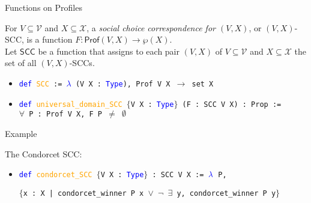 \documentclass[12pt,xcolor=svgnames,blue,aspectratio=169]{beamer}
\begin{document}
\begin{frame}

{\Huge Functions on Profiles}

\end{frame}
\begin{frame}

\begin{definition} For $V\subseteq\mathcal{V}$ and $X\subseteq\mathcal{X}$, a \textit{social choice correspondence for $(V,X)$}, or $(V,X)$-SCC, is a function  $F: \mathsf{Prof}(V,X)\to \wp(X)$. \\[8pt]


Let $\mathsf{SCC}$ be a function that assigns to each pair $(V,X)$ of $V\subseteq\mathcal{V}$ and $X\subseteq\mathcal{X}$ the set of all $(V,X)$-SCCs.
\end{definition}

\pause 
\begin{itemize}
\item[] \texttt{\textcolor{blue}{def} \textcolor{orange}{SCC} := \textcolor{blue}{$\lambda$} (V X : \textcolor{blue}{Type}), Prof V X $\to$ set X}
\end{itemize}

 
\vspace{.25in}
\pause

\begin{itemize}
\item[] \texttt{\textcolor{blue}{def} \textcolor{orange}{universal\_domain\_SCC} $\{$V X : \textcolor{blue}{Type}$\}$ (F : SCC V X) : Prop :=} \\
\texttt{$\forall$ P : Prof V X, F P $\neq$ $\emptyset$}

\end{itemize}

\end{frame}

\begin{frame}{Example}

The Condorcet SCC: \\[4pt]

\begin{itemize}
\item[] \texttt{\textcolor{blue}{def} \textcolor{orange}{condorcet\_SCC} $\{$V X : \textcolor{blue}{Type}$\}$ : SCC V X := $\textcolor{blue}{\lambda}$ P, }

\texttt{\small $\{$x : X |  condorcet\_winner P x $\vee$  $\neg$ $\exists$ y, condorcet\_winner P y$\}$}
\end{itemize}
\end{frame}
\end{document}
